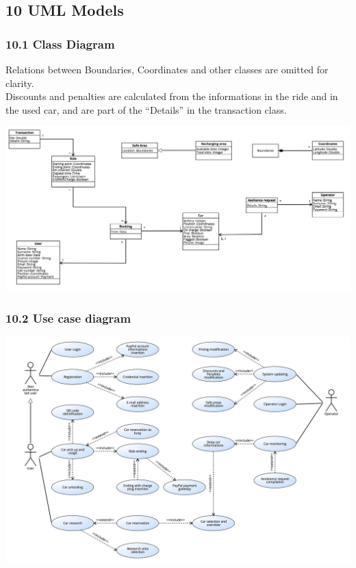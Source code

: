 \documentclass[]{article}
\begin{document}
\newpage

\subsection{10 UML Models}\label{uml-models}

\subsubsection{10.1 Class Diagram}\label{class-diagram}

Relations between Boundaries, Coordinates and other classes are omitted
for clarity.\\
Discounts and penalties are calculated from the informations in the ride
and in the used car, and are part of the ``Details'' in the transaction
class.

\centerline{\includegraphics[width=6.25000in]{./classdiagram/classdiagram-1.png}}\newpage

\subsubsection{10.2 Use case diagram}\label{use-case-diagram}

\centerline{\includegraphics[width=6.25000in]{./uc/uc.png}}\newpage
\end{document}
